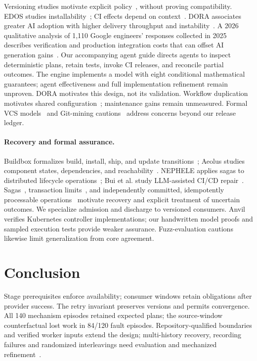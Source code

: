 Versioning studies motivate explicit policy~\cite{raemaekers,bogart,decan},
without proving compatibility. EDOS studies installability~\cite{edos};
CI effects depend on context~\cite{huangci}.
DORA associates greater AI adoption with higher delivery throughput and
instability~\cite{dora2025}. A 2026 qualitative analysis of 1,110 Google
engineers' responses collected in 2025 describes verification and production
integration costs that can offset AI generation gains~\cite{dora2026tensions}.
Our accompanying agent guide directs agents to
inspect deterministic plans, retain tests, invoke CI releases, and reconcile
partial outcomes. The engine implements a model with eight conditional
mathematical guarantees; agent effectiveness and full implementation refinement
remain unproven. DORA motivates this design, not its validation.
Workflow duplication motivates shared configuration~\cite{cardoen};
maintenance gains remain unmeasured. Formal VCS models~\cite{swierstraloh,hpt,mimram,mrdt}
and Git-mining cautions~\cite{birdgit} address concerns beyond our release ledger.

\paragraph{Recovery and formal assurance.}
Buildbox formalizes build, install, ship, and update transitions~\cite{liusmith};
Aeolus studies component states, dependencies, and reachability~\cite{aeolus}.
NEPHELE applies sagas to distributed lifecycle operations~\cite{nephele};
Bui et al. study LLM-assisted CI/CD repair~\cite{bui}.
Sagas~\cite{sagas}, transaction limits~\cite{gray}, and independently committed,
idempotently processable operations~\cite{helland07,helland12} motivate recovery
and explicit treatment of uncertain outcomes. We specialize admission and
discharge to versioned consumers. Anvil~\cite{anvil} verifies Kubernetes
controller implementations; our handwritten model proofs and sampled execution
tests provide weaker assurance. Fuzz-evaluation cautions~\cite{klees} likewise
limit generalization from core agreement.

\section{Conclusion}
\label{sec:conclusion}
Stage prerequisites enforce availability; consumer windows retain obligations
after provider success. The retry invariant preserves versions and permits
convergence. All 140 mechanism episodes retained expected plans; the
source-window counterfactual lost work in 84/120 fault episodes. Repository-qualified
boundaries and verified worker inputs extend the design; multi-history recovery,
recording failures and randomized interleavings need evaluation and mechanized
refinement~\cite{lamport}.

